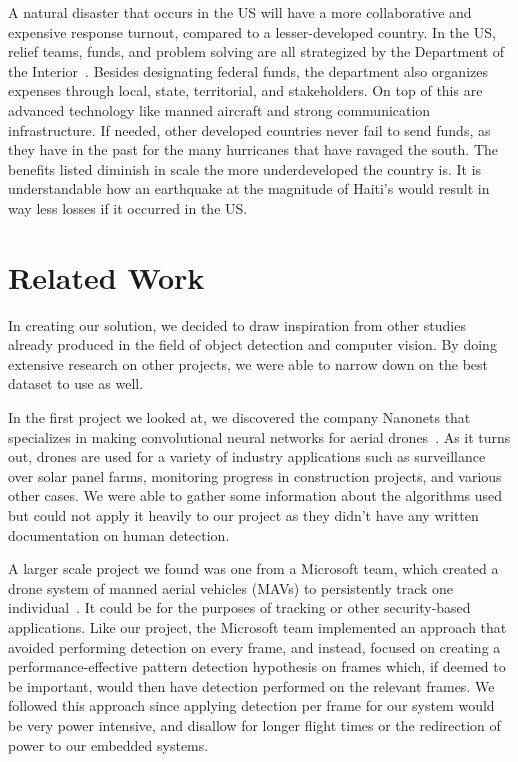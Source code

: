 
A natural disaster that occurs in the US will have a more collaborative and expensive response turnout, compared to a lesser-developed country. In the US, relief teams, funds, and problem solving are all strategized by the Department of the Interior~\cite{interiorjob}. Besides designating federal funds, the department also organizes expenses through local, state, territorial, and stakeholders. On top of this are advanced technology like manned aircraft and strong communication infrastructure. If needed, other developed countries never fail to send funds, as they have in the past for the many hurricanes that have ravaged the south. The benefits listed diminish in scale the more underdeveloped the country is. It is understandable how an earthquake at the magnitude of Haiti’s would result in way less losses if it occurred in the US. 

\section{Related Work}
In creating our solution, we decided to draw inspiration from other studies already produced in the field of object detection and computer vision. By doing extensive research on other projects, we were able to narrow down on the best dataset to use as well. 

In the first project we looked at, we discovered the company Nanonets that specializes in making convolutional neural networks for aerial drones~\cite{nanotech}. As it turns out, drones are used for a variety of industry applications such as surveillance over solar panel farms, monitoring progress in construction projects, and various other cases. We were able to gather some information about the algorithms used but could not apply it heavily to our project as they didn’t have any written documentation on human detection. 

A larger scale project we found was one from a Microsoft team, which created a drone system of manned aerial vehicles (MAVs) to persistently track one individual~\cite{monocularmav}. It could be for the purposes of tracking or other security-based applications. Like our project, the Microsoft team implemented an approach that avoided performing detection on every frame, and instead, focused on creating a performance-effective pattern detection hypothesis on frames which, if deemed to be important, would then have detection performed on the relevant frames. We followed this approach since applying detection per frame for our system would be very power intensive, and disallow for longer flight times or the redirection of power to our embedded systems. 

